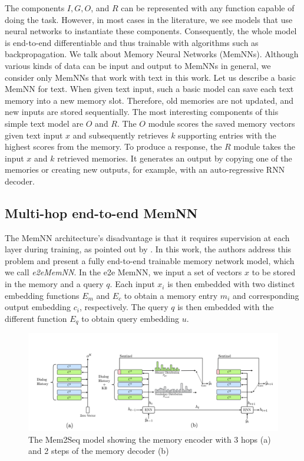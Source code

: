 The components $I, G, O$, and $R$ can be represented with any function capable of doing the task.
However, in most cases in the literature, we see models that use neural networks to instantiate these components.
Consequently, the whole model is end-to-end differentiable and thus trainable with algorithms such as backpropagation.
We talk about Memory Neural Networks (MemNNs).
Although various kinds of data can be input and output to MemNNs in general, we consider only MemNNs that work with text in this work.
Let us describe a basic MemNN for text.
When given text input, such a basic model can save each text memory into a new memory slot.
Therefore, old memories are not updated, and new inputs are stored sequentially.
The most interesting components of this simple text model are $O$ and $R$.
The $O$ module scores the saved memory vectors given text input $x$ and subsequently retrieves $k$ supporting entries with the highest scores from the memory.
To produce a response, the $R$ module takes the input $x$ and $k$ retrieved memories.
It generates an output by copying one of the memories or creating new outputs, for example, with an auto-regressive RNN decoder. 

\subsection{Multi-hop end-to-end MemNN}
The MemNN architecture's disadvantage is that it requires supervision at each layer during training, as pointed out by \citet{sukhbaatar2015end}.
In this work, the authors address this problem and present a fully end-to-end trainable memory network model, which we call \emph{e2eMemNN}.
In the e2e MemNN, we input a set of vectors $x$ to be stored in the memory and a query $q$.
Each input $x_i$ is then embedded with two distinct embedding functions $E_m$ and $E_c$ to obtain a memory entry $m_i$ and corresponding output embedding $c_i$, respectively.
The query $q$ is then embedded with the different function $E_q$ to obtain query embedding $u$.

\begin{figure}[t]
    \centering
    \includegraphics[width=\textwidth]{images/mem2seq.png}
    \caption{The Mem2Seq model \cite{madotto-etal-2018-mem2seq} showing the memory encoder with 3 hops (a) and 2 steps of the memory decoder (b) }
    \label{fig:mem2seq}
\end{figure}

